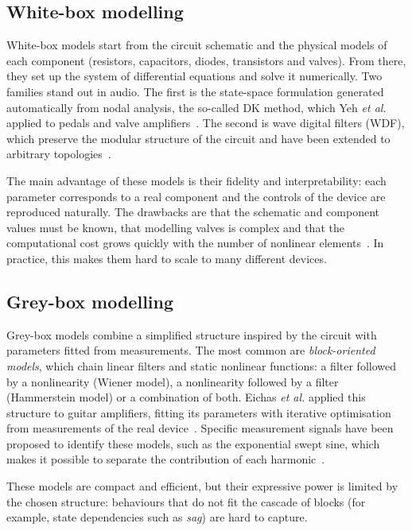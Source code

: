 \documentclass[ENG]{TFUOC}%
\begin{document}
\subsection{White-box modelling}

White-box models start from the circuit schematic and the physical models of each component (resistors, capacitors, diodes, transistors and valves). From there, they set up the system of differential equations and solve it numerically. Two families stand out in audio. The first is the state-space formulation generated automatically from nodal analysis, the so-called DK method, which Yeh \emph{et al.} applied to pedals and valve amplifiers~\cite{yeh2009,yeh2010}. The second is wave digital filters (WDF), which preserve the modular structure of the circuit and have been extended to arbitrary topologies~\cite{werner2015}.

The main advantage of these models is their fidelity and interpretability: each parameter corresponds to a real component and the controls of the device are reproduced naturally. The drawbacks are that the schematic and component values must be known, that modelling valves is complex and that the computational cost grows quickly with the number of nonlinear elements~\cite{pakarinen2009}. In practice, this makes them hard to scale to many different devices.

\subsection{Grey-box modelling}

Grey-box models combine a simplified structure inspired by the circuit with parameters fitted from measurements. The most common are \emph{block-oriented models}, which chain linear filters and static nonlinear functions: a filter followed by a nonlinearity (Wiener model), a nonlinearity followed by a filter (Hammerstein model) or a combination of both. Eichas \emph{et al.} applied this structure to guitar amplifiers, fitting its parameters with iterative optimisation from measurements of the real device~\cite{eichas2017}. Specific measurement signals have been proposed to identify these models, such as the exponential swept sine, which makes it possible to separate the contribution of each harmonic~\cite{novak2010}.

These models are compact and efficient, but their expressive power is limited by the chosen structure: behaviours that do not fit the cascade of blocks (for example, state dependencies such as \emph{sag}) are hard to capture.
\end{document}
